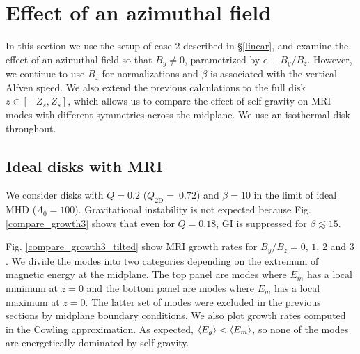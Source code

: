 \section{Effect of an azimuthal field}\label{result3}
In this section we use the setup of case 2 described in
\S\ref{linear}, and examine the effect of an azimuthal field so that
$B_y\neq 0$,   
parametrized by $\epsilon \equiv B_y/B_z$. However, we continue to
use $B_z$ for normalizations and $\beta$ is associated with the
vertical Alfven speed. We also extend the previous calculations to the
full disk $z\in[-Z_s,Z_s]$,  which allows us to compare the effect of
self-gravity on MRI modes with different symmetries across the
midplane. We use an isothermal disk throughout. 

\subsection{Ideal disks with MRI} 
We consider disks with $Q=0.2$ ($Q_\mathrm{2D}=~0.72$) and
$\beta=10$ in the limit of ideal MHD ($\Lambda_0=100$). Gravitational
instability is not expected because Fig. \ref{compare_growth3} shows
that even for $Q=0.18$, GI is suppressed for $\beta \lesssim 15$. 

Fig. \ref{compare_growth3_tilted} show MRI growth rates for
$B_y/B_z=0,\,1,\,2$ and $3$. We divide the modes into two categories
depending on the extremum of magnetic energy at the midplane. 
The top panel are modes where $E_m$ has a local minimum at $z=0$ and 
the bottom panel are modes where $E_m$ has a local maximum at $z=0$. 
The latter set of modes were excluded in the previous sections by
midplane boundary conditions. 
We also plot growth rates computed in the Cowling
approximation. As expected,  $\langle{E_g}\rangle<\langle{E_m}\rangle$, so none of the
modes are energetically dominated by self-gravity. 



